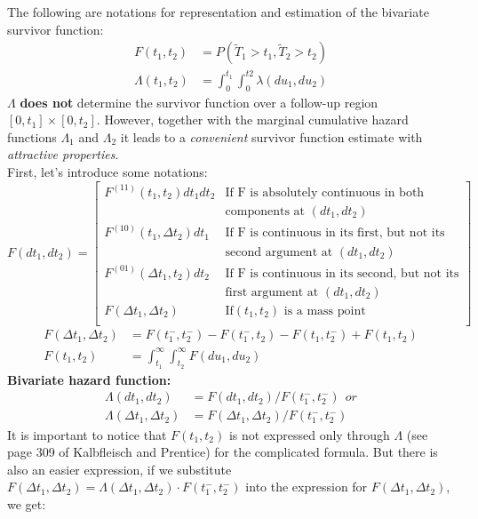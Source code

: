 \documentclass[]{article}
\begin{document}
The following are notations for representation and estimation of the bivariate survivor function:
	$$
	\begin{aligned}
		F(t_1,t_2) &= P(\tilde{T}_1>t_1,\tilde{T}_2 > t_2)\\
		\Lambda(t_1,t_2) &= \int_0^{t_1} \int_0^{t2} \lambda(du_1, du_2)
	\end{aligned}
	$$
$\Lambda$ \textbf{does not} determine the survivor function over a follow-up region $[0,t_1] \times [0,t_2]$. However, together with the marginal cumulative hazard functions $\Lambda_1$ and $\Lambda_2$ it leads to a \emph{convenient} survivor function estimate with \emph{attractive properties}.\\
First, let's introduce some notations:
\[
F(dt_1, dt_2)=
\begin{bmatrix}
    F^{(11)}(t_1, t_2)dt_1 dt_2 & \text{If F is absolutely continuous in both} \\
        & \text{components at }(dt_1, dt_2) \\
    F^{(10)}(t_1, \Delta t_2)dt_1 & \text{If F is continuous in its first, but not its }\\
        & \text{second argument at }(dt_1, dt_2) \\
    F^{(01)}(\Delta t_1, t_2)dt_2 & \text{If F is continuous in its second, but not its} \\
        & \text{first argument at }(dt_1, dt_2) \\
    F(\Delta t_1, \Delta t_2) & \text{If} (t_1, t_2)\text{ is a mass point}\\
\end{bmatrix}
\]
	$$
	\begin{aligned}
		F(\Delta t_1, \Delta t_2) &= F(t_1^-, t_2^-) - F(t_1^-, t_2) - F(t_1, t_2^-) + F(t_1, t_2)\\
		F(t_1, t_2) &= \int_{t_1}^{\infty} \int_{t_2}^{\infty} F(du_1, du_2)
	\end{aligned}
	$$
\textbf{Bivariate hazard function:}
	$$
	\begin{aligned}
		\Lambda(dt_1, dt_2) &= F(dt_1, dt_2)/F(t_1^-, t_2^-) ~~or\\
		\Lambda(\Delta t_1, \Delta t_2) &= F(\Delta t_1, \Delta t_2)/F(t_1^-, t_2^-)
	\end{aligned}
	$$
It is important to notice that $F(t_1,t_2)$ is not expressed only through $\Lambda$ (see page 309 of Kalbfleisch and Prentice) for the complicated formula. But there is also an easier expression, if we substitute $F(\Delta t_1, \Delta t_2) = \Lambda(\Delta t_1, \Delta t_2) \cdot F(t_1^-, t_2^-)$ into the expression for $F(\Delta t_1, \Delta t_2)$, we get:
\end{document}
